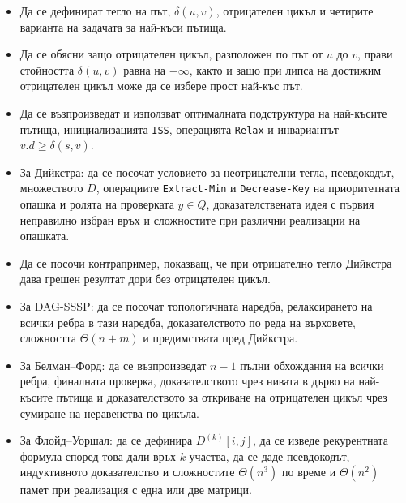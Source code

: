 \begin{itemize}
\item Да се дефинират тегло на път, $\delta(u,v)$, отрицателен цикъл и четирите варианта на задачата за най-къси пътища.

\item Да се обясни защо отрицателен цикъл, разположен по път от $u$ до $v$, прави стойността $\delta(u,v)$ равна на $-\infty$, както и защо при липса на достижим отрицателен цикъл може да се избере прост най-къс път.

\item Да се възпроизведат и използват оптималната подструктура на най-късите пътища, инициализацията \texttt{ISS}, операцията \texttt{Relax} и инвариантът $v.d\geq\delta(s,v)$.

\item За Дийкстра: да се посочат условието за неотрицателни тегла, псевдокодът, множеството $D$, операциите \verb|Extract-Min| и \verb|Decrease-Key| на приоритетната опашка и ролята на проверката $y\in Q$, доказателствената идея с първия неправилно избран връх и сложностите при различни реализации на опашката.

\item Да се посочи контрапример, показващ, че при отрицателно тегло Дийкстра дава грешен резултат дори без отрицателен цикъл.

\item За DAG-SSSP: да се посочат топологичната наредба, релаксирането на всички ребра в тази наредба, доказателството по реда на върховете, сложността $\Theta(n+m)$ и предимствата пред Дийкстра.

\item За Белман--Форд: да се възпроизведат $n-1$ пълни обхождания на всички ребра, финалната проверка, доказателството чрез нивата в дърво на най-късите пътища и доказателството за откриване на отрицателен цикъл чрез сумиране на неравенства по цикъла.

\item За Флойд--Уоршал: да се дефинира $D^{(k)}[i,j]$, да се изведе рекурентната формула според това дали връх $k$ участва, да се даде псевдокодът, индуктивното доказателство и сложностите $\Theta(n^3)$ по време и $\Theta(n^2)$ памет при реализация с една или две матрици.
\end{itemize}
